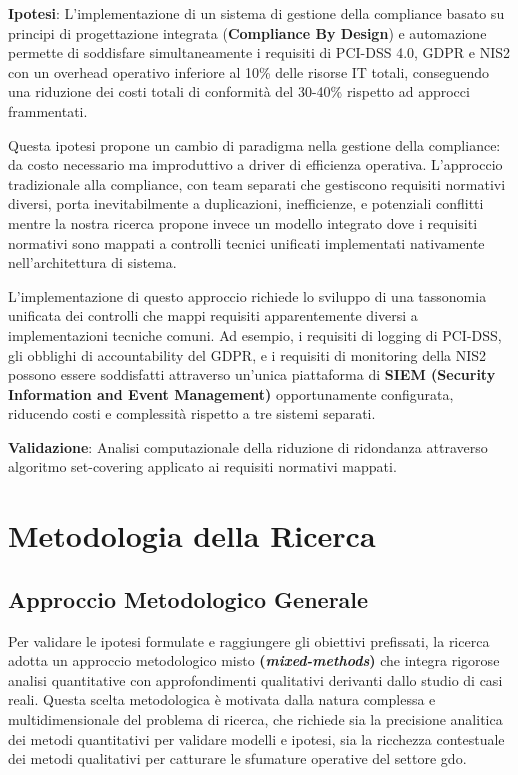 \label{ssec:h3}
\textbf{Ipotesi}: L'implementazione di un sistema di gestione della compliance basato su principi di progettazione integrata (\textbf{Compliance By Design}) e automazione permette di soddisfare simultaneamente i requisiti di PCI-DSS 4.0, GDPR e NIS2 con un overhead operativo inferiore al 10\% delle risorse IT totali, conseguendo una riduzione dei costi totali di conformità del 30-40\% rispetto ad approcci frammentati.

Questa ipotesi propone un cambio di paradigma nella gestione della compliance: da costo necessario ma improduttivo a driver di efficienza operativa. L'approccio tradizionale alla compliance, con team separati che gestiscono requisiti normativi diversi, porta inevitabilmente a duplicazioni, inefficienze, e potenziali conflitti mentre la nostra ricerca propone invece un modello integrato dove i requisiti normativi sono mappati a controlli tecnici unificati implementati nativamente nell'architettura di sistema.

L'implementazione di questo approccio richiede lo sviluppo di una tassonomia unificata dei controlli che mappi requisiti apparentemente diversi a implementazioni tecniche comuni. Ad esempio, i requisiti di logging di PCI-DSS, gli obblighi di accountability del GDPR, e i requisiti di monitoring della NIS2 possono essere soddisfatti attraverso un'unica piattaforma di \textbf{SIEM (Security Information and Event Management)} opportunamente configurata, riducendo costi e complessità rispetto a tre sistemi separati.

\textbf{Validazione}: Analisi computazionale della riduzione di ridondanza attraverso algoritmo set-covering applicato ai requisiti normativi mappati.

\section{Metodologia della Ricerca}
\label{sec:metodologia}

\subsection{Approccio Metodologico Generale}
\label{ssec:approccio_metodologico}

Per validare le ipotesi formulate e raggiungere gli obiettivi prefissati, la ricerca adotta un approccio metodologico misto \textbf{(\textit{mixed-methods})} che integra rigorose analisi quantitative con approfondimenti qualitativi derivanti dallo studio di casi reali. Questa scelta metodologica è motivata dalla natura complessa e multidimensionale del problema di ricerca, che richiede sia la precisione analitica dei metodi quantitativi per validare modelli e ipotesi, sia la ricchezza contestuale dei metodi qualitativi per catturare le sfumature operative del settore \gls{gdo}.

